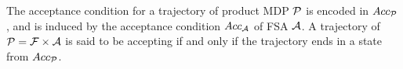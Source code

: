 \documentclass[letterpaper]{article} %
\newcommand{\sofie}[1]{{\color{purple} [Sofie] #1}}
\begin{document}



The acceptance condition for a trajectory of product MDP $\mathcal{P}$ is encoded in
$Acc_{\mathcal{P}}$, and is induced by the acceptance condition $Acc_{\mathcal{A}}$ of
FSA $\mathcal{A}$.
A trajectory of $\mathcal{P} = \mathcal{F} \times \mathcal{A}$ is said to be accepting
if and only if the trajectory ends in a state from $Acc_{\mathcal{P}}$. 

\end{document}

